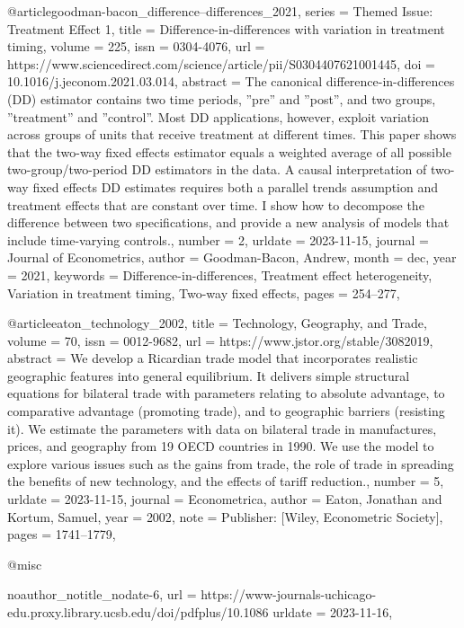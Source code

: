 {{@article{goodman-bacon_difference--differences_2021,
	series = {Themed {Issue}: {Treatment} {Effect} 1},
	title = {Difference-in-differences with variation in treatment timing},
	volume = {225},
	issn = {0304-4076},
	url = {https://www.sciencedirect.com/science/article/pii/S0304407621001445},
	doi = {10.1016/j.jeconom.2021.03.014},
	abstract = {The canonical difference-in-differences (DD) estimator contains two time periods, ”pre” and ”post”, and two groups, ”treatment” and ”control”. Most DD applications, however, exploit variation across groups of units that receive treatment at different times. This paper shows that the two-way fixed effects estimator equals a weighted average of all possible two-group/two-period DD estimators in the data. A causal interpretation of two-way fixed effects DD estimates requires both a parallel trends assumption and treatment effects that are constant over time. I show how to decompose the difference between two specifications, and provide a new analysis of models that include time-varying controls.},
	number = {2},
	urldate = {2023-11-15},
	journal = {Journal of Econometrics},
	author = {Goodman-Bacon, Andrew},
	month = dec,
	year = {2021},
	keywords = {Difference-in-differences, Treatment effect heterogeneity, Variation in treatment timing, Two-way fixed effects},
	pages = {254--277},
}

@article{eaton_technology_2002,
	title = {Technology, {Geography}, and {Trade}},
	volume = {70},
	issn = {0012-9682},
	url = {https://www.jstor.org/stable/3082019},
	abstract = {We develop a Ricardian trade model that incorporates realistic geographic features into general equilibrium. It delivers simple structural equations for bilateral trade with parameters relating to absolute advantage, to comparative advantage (promoting trade), and to geographic barriers (resisting it). We estimate the parameters with data on bilateral trade in manufactures, prices, and geography from 19 OECD countries in 1990. We use the model to explore various issues such as the gains from trade, the role of trade in spreading the benefits of new technology, and the effects of tariff reduction.},
	number = {5},
	urldate = {2023-11-15},
	journal = {Econometrica},
	author = {Eaton, Jonathan and Kortum, Samuel},
	year = {2002},
	note = {Publisher: [Wiley, Econometric Society]},
	pages = {1741--1779},
}

@misc{noauthor_notitle_nodate-6,
	url = {https://www-journals-uchicago-edu.proxy.library.ucsb.edu/doi/pdfplus/10.1086%
	urldate = {2023-11-16},
}

}}}

